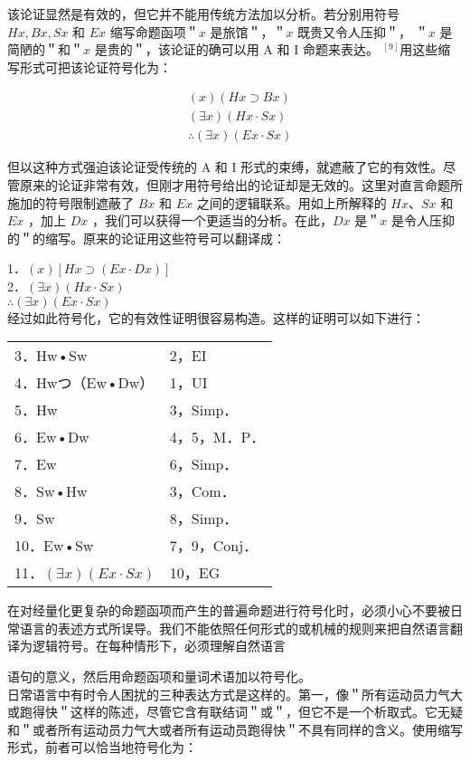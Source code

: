 该论证显然是有效的，但它并不能用传统方法加以分析。若分别用符号 $H x, B x, S x$ 和 $E x$ 缩写命题函项＂$x$ 是旅馆＂，＂$x$ 既贵又令人压抑＂， ＂$x$ 是简陋的＂和＂$x$ 是贵的＂，该论证的确可以用 A 和 I 命题来表达。 ${ }^{[9]}$用这些缩写形式可把该论证符号化为：

$$
\begin{aligned}
& (x)(H x \supset B x) \\
& (\exists x)(H x \cdot S x) \\
& \therefore(\exists x)(E x \cdot S x)
\end{aligned}
$$

但以这种方式强迫该论证受传统的 A 和 I 形式的束缚，就遮蔽了它的有效性。尽管原来的论证非常有效，但刚才用符号给出的论证却是无效的。这里对直言命题所施加的符号限制遮蔽了 $B x$ 和 $E x$ 之间的逻辑联系。用如上所解释的 $H x 、 S x$ 和 $E x$ ，加上 $D x$ ，我们可以获得一个更适当的分析。在此，$D x$ 是＂$x$ 是令人压抑的＂的缩写。原来的论证用这些符号可以翻译成：

1．$(x)[H x \supset(E x \cdot D x)]$\\
2．$(\exists x)(H x \cdot S x)$\\
$\therefore(\exists x)(E x \cdot S x)$\\
经过如此符号化，它的有效性证明很容易构造。这样的证明可以如下进行：

\begin{center}
\begin{tabular}{ll}
3．Hw•Sw & 2，EI \\
4．Hwつ（Ew•Dw） & 1，UI \\
5．Hw & 3，Simp． \\
6．Ew•Dw & 4，5，M．P． \\
7．Ew & 6，Simp． \\
8．Sw•Hw & 3，Com． \\
9．Sw & 8，Simp． \\
10．Ew•Sw & 7，9，Conj． \\
11．$(\exists x)(E x \cdot S x)$ & 10，EG \\
\end{tabular}
\end{center}

在对经量化更复杂的命题函项而产生的普遍命题进行符号化时，必须小心不要被日常语言的表述方式所误导。我们不能依照任何形式的或机械的规则来把自然语言翻译为逻辑符号。在每种情形下，必须理解自然语言

语句的意义，然后用命题函项和量词术语加以符号化。\\
日常语言中有时令人困扰的三种表达方式是这样的。第一，像＂所有运动员力气大或跑得快＂这样的陈述，尽管它含有联结词＂或＂，但它不是一个析取式。它无疑和＂或者所有运动员力气大或者所有运动员跑得快＂不具有同样的含义。使用缩写形式，前者可以恰当地符号化为：

